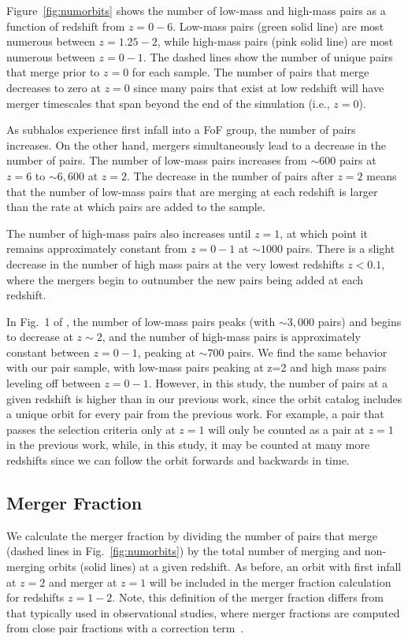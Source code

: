 \documentclass[twocolumn,linenumbers]{aastex631}
\newcommand{\chambe}{\citet{Chamberlain2024}}
\begin{document}
Figure~\ref{fig:numorbits} shows the number of low-mass and high-mass pairs as a function of redshift from $z=0-6$. 
Low-mass pairs (green solid line) are most numerous between $z=1.25-2$, while high-mass pairs (pink solid line) are most numerous between $z=0-1$.
The dashed lines show the number of unique pairs that merge prior to $z=0$ for each sample. 
The number of pairs that merge decreases to zero at $z=0$ since many pairs that exist at low redshift will have merger timescales that span beyond the end of the simulation (i.e., $z=0$). 

As subhalos experience first infall into a FoF group, the number of pairs increases. 
On the other hand, mergers simultaneously lead to a decrease in the number of pairs.
The number of low-mass pairs increases from $\sim600$ pairs at $z=6$ to $\sim6,600$ at $z=2$. 
The decrease in the number of pairs after $z=2$ means that the number of low-mass pairs that are merging at each redshift is larger than the rate at which pairs are added to the sample.

The number of high-mass pairs also increases until $z=1$, at which point it remains approximately constant from $z=0-1$ at $\sim1000$ pairs. 
There is a slight decrease in the number of high mass pairs at the very lowest redshifts $z<0.1$, where the mergers begin to outnumber the new pairs being added at each redshift.

In Fig.~1 of \chambe{}, the number of low-mass pairs peaks (with $\sim3,000$ pairs) and begins to decrease at $z\sim2$, and the number of high-mass pairs is approximately constant between $z=0-1$, peaking at $\sim700$ pairs. 
We find the same behavior with our pair sample, with low-mass pairs peaking at z=2 and high mass pairs leveling off between $z=0-1$. 
However, in this study, the number of pairs at a given redshift is higher than in our previous work, since the orbit catalog includes a unique orbit for every pair from the previous work.
For example, a pair that passes the \chambe{} selection criteria only at $z=1$ will only be counted as a pair at $z=1$ in the previous work, while, in this study, it may be counted at many more redshifts since we can follow the orbit forwards and backwards in time. 

\subsection{Merger Fraction}\label{sec:pairprops-frac}
    We calculate the merger fraction by dividing the number of pairs that merge (dashed lines in Fig.~\ref{fig:numorbits}) by the total number of merging and non-merging orbits (solid lines) at a given redshift. 
    As before, an orbit with first infall at $z=2$ and merger at $z=1$ will be included in the merger fraction calculation for redshifts $z=1-2$.
    Note, this definition of the merger fraction differs from that typically used in observational studies, where merger fractions are computed from close pair fractions with a correction term~\cite[e.g.,][]{Ventou2019}. 
    
\end{document}
